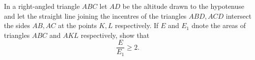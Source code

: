 In a right-angled triangle $ ABC$ let $ AD$ be the altitude drawn to the hypotenuse and let the straight line joining the incentres of the triangles $ ABD, ACD$ intersect the sides $ AB, AC$ at the points $ K,L$ respectively. If $ E$ and $ E_1$ dnote the areas of triangles $ ABC$ and $ AKL$ respectively, show that\[ \frac {E}{E_1} \geq 2.
\]
